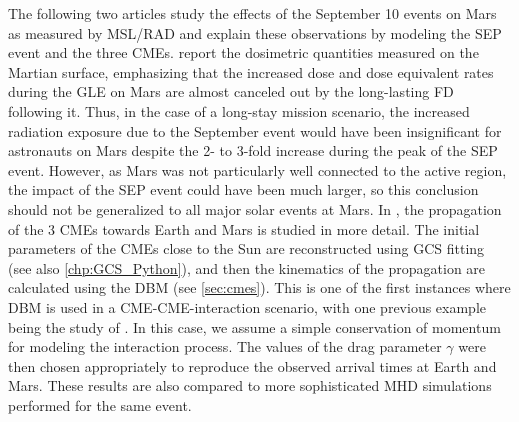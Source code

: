 The following two articles \citep{Zeitlin-2018,Guo-2018} study the effects of the September 10 events on Mars as measured by \ac{MSL}/\ac{RAD} and explain these observations by modeling the \ac{SEP} event and the three \acp{CME}. \citet{Zeitlin-2018} report the dosimetric quantities measured on the Martian surface, emphasizing that the increased dose and dose equivalent rates during the \ac{GLE} on Mars are almost canceled out by the long-lasting \ac{FD} following it. Thus, in the case of a long-stay mission scenario, the increased radiation exposure due to the September event would have been insignificant for astronauts on Mars despite the 2- to 3-fold increase during the peak of the \ac{SEP} event. However, as Mars was not particularly well connected to the active region, the impact of the \ac{SEP} event could have been much larger, so this conclusion should not be generalized to all major solar events at Mars. In \citet{Guo-2018}, the propagation of the 3 \acp{CME} towards Earth and Mars is studied in more detail. The initial parameters of the \acp{CME} close to the Sun are reconstructed using \ac{GCS} fitting (see also \autoref{chp:GCS_Python}), and then the kinematics of the propagation are calculated using the \ac{DBM} (see \autoref{sec:cmes}). This is one of the first instances where \ac{DBM} is used in a \ac{CME}-\ac{CME}-interaction scenario, with one previous example being the study of \citet{Temmer-2012}. In this case, we assume a simple conservation of momentum for modeling the interaction process. The values of the drag parameter $\gamma$ were then chosen appropriately to reproduce the observed arrival times at Earth and Mars. These results are also compared to more sophisticated \ac{MHD} simulations performed for the same event.


